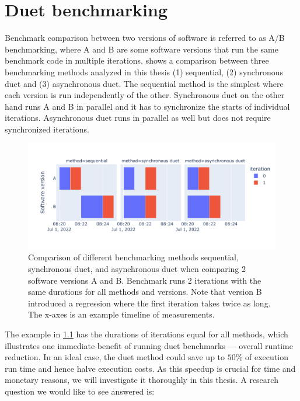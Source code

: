 \chapter{Duet benchmarking}
\label{chap:duet}

Benchmark comparison between two versions of software is referred to as A/B benchmarking, where A and B are some software versions that run the same benchmark code in multiple iterations.
 shows a comparison between three benchmarking methods analyzed in this thesis (1) sequential, (2) synchronous duet and (3) asynchronous duet.
The sequential method is the simplest where each version is run independently of the other.
Synchronous duet on the other hand runs A and B in parallel and it has to synchronize the starts of individual iterations.
Asynchronous duet runs in parallel as well but does not require synchronized iterations.

\begin{figure}
	\centering
	\includegraphics[width=.9\linewidth]{./figures/method_timeline.pdf}
	\caption{
	Comparison of different benchmarking methods sequential, synchronous duet, and asynchronous duet when comparing 2 software versions A and B.
	Benchmark runs 2 iterations with the same durations for all methods and versions.
	Note that version B introduced a regression where the first iteration takes twice as long.
	The \mbox{x-axes} is an example timeline of measurements.
	}
	\label{fig:method_timeline}
\end{figure}

The example in \cref{fig:method_timeline} has the durations of iterations equal for all methods, which illustrates one immediate benefit of running duet benchmarks --- overall runtime reduction.
In an ideal case, the duet method could save up to $50\%$ of execution run time and hence halve execution costs.
As this speedup is crucial for time and monetary reasons, we will investigate it thoroughly in this thesis.
A research question we would like to see answered is:

